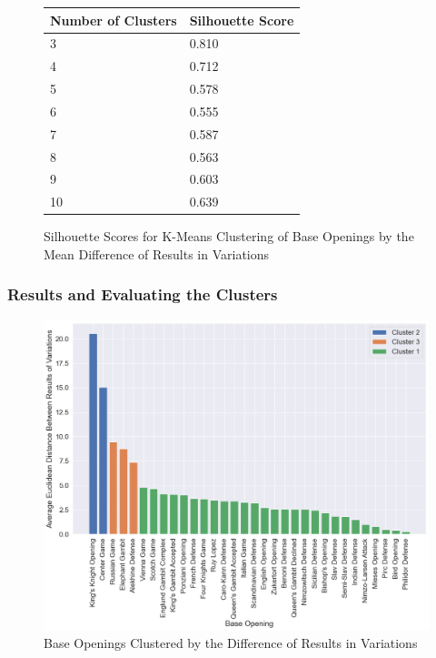 \documentclass[a4paper, 11pt]{article}
\begin{document}
\begin{figure}[H]
    \centering
    \caption{Silhouette Scores for K-Means Clustering of Base Openings by the Mean Difference of Results in Variations}
    \label{fig:silhouetteScoresForBaseOpeningsClusteredByDifferenceInVariations}
    \begin{tabular}{| l | l |} 
        \hline
        \bf{Number of Clusters} & \bf{Silhouette Score} \\ [0.5ex] 
        \hline
        3 & 0.810 \\
        \hline
        4 & 0.712 \\
        \hline
        5 & 0.578 \\
        \hline
        6 & 0.555 \\
        \hline
        7 & 0.587 \\
        \hline
        8 & 0.563 \\
        \hline
        9 & 0.603 \\
        \hline
        10 & 0.639 \\
        \hline
    \end{tabular}
\end{figure}

\subsubsection{Results and Evaluating the Clusters}

\begin{figure}[H]
    \centering
    \caption{Base Openings Clustered by the Difference of Results in Variations}
    \label{fig:baseOpeningsClusteredByDifferenceOfResultsInVariations}
    \includegraphics[width=\textwidth]{Base Openings Clustered by Difference in Variations.png}
\end{figure}
\end{document}
